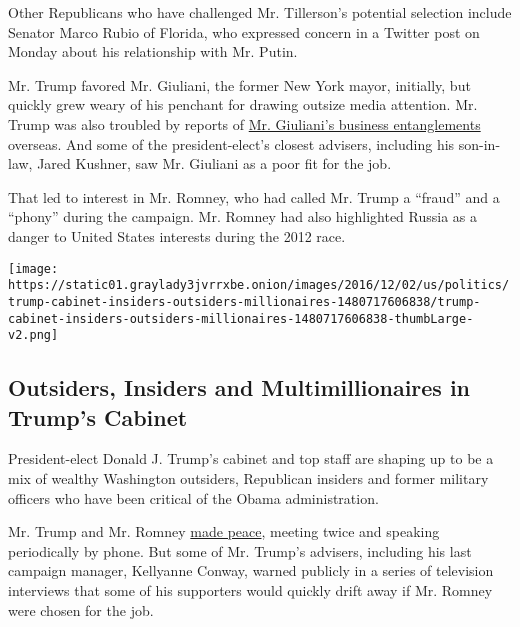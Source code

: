 Other Republicans who have challenged Mr. Tillerson's potential
selection include Senator Marco Rubio of Florida, who expressed concern
in a Twitter post on Monday about his relationship with Mr. Putin.

Mr. Trump favored Mr. Giuliani, the former New York mayor, initially,
but quickly grew weary of his penchant for drawing outsize media
attention. Mr. Trump was also troubled by reports of
\href{https://www.nytimes3xbfgragh.onion/2016/11/16/us/politics/donald-trump-cabinet-rudy-giuliani.html}{Mr.
Giuliani's business entanglements} overseas. And some of the
president-elect's closest advisers, including his son-in-law, Jared
Kushner, saw Mr. Giuliani as a poor fit for the job.

That led to interest in Mr. Romney, who had called Mr. Trump a ``fraud''
and a ``phony'' during the campaign. Mr. Romney had also highlighted
Russia as a danger to United States interests during the 2012 race.

\href{https://www.nytimes3xbfgragh.onion/interactive/2016/12/05/us/politics/trump-cabinet-insiders-outsiders-millionaires.html}{}

\texttt{[image: https://static01.graylady3jvrrxbe.onion/images/2016/12/02/us/politics/trump-cabinet-insiders-outsiders-millionaires-1480717606838/trump-cabinet-insiders-outsiders-millionaires-1480717606838-thumbLarge-v2.png]}

\hypertarget{outsiders-insiders-and-multimillionaires-in-trumps-cabinet}{%
\subsection{Outsiders, Insiders and Multimillionaires in Trump's
Cabinet}\label{outsiders-insiders-and-multimillionaires-in-trumps-cabinet}}

President-elect Donald J. Trump's cabinet and top staff are shaping up
to be a mix of wealthy Washington outsiders, Republican insiders and
former military officers who have been critical of the Obama
administration.

Mr. Trump and Mr. Romney
\href{https://www.nytimes3xbfgragh.onion/2016/11/20/us/politics/donald-trump-mitt-romney-secretary-state.html}{made
peace}, meeting twice and speaking periodically by phone. But some of
Mr. Trump's advisers, including his last campaign manager, Kellyanne
Conway, warned publicly in a series of television interviews that some
of his supporters would quickly drift away if Mr. Romney were chosen for
the job.

